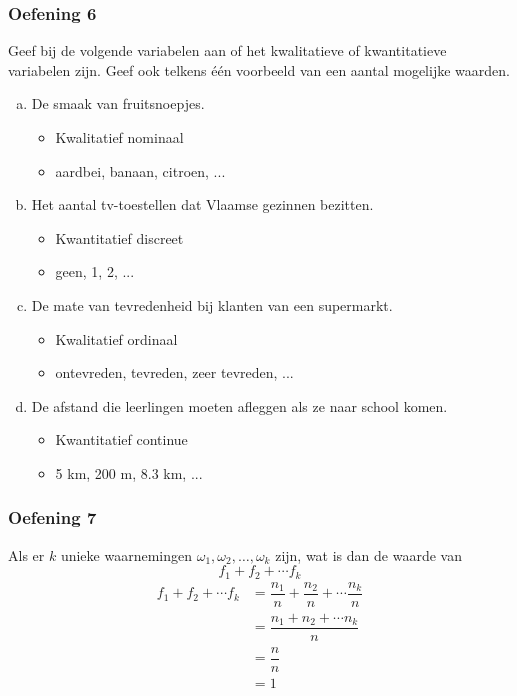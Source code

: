 \documentclass[13pt]{beamer}
\newenvironment{answer}
{\color{blue}}
{\color{black}}
\begin{document}
\begin{frame}
  \frametitle{Oefening 6}
  Geef bij de volgende variabelen aan of het kwalitatieve of kwantitatieve variabelen zijn. Geef ook telkens één voorbeeld van een aantal mogelijke waarden.
  \begin{enumerate}[(a)]
  \item De smaak van fruitsnoepjes.
    \begin{itemize}
      \begin{answer}
      \item Kwalitatief nominaal
      \item aardbei, banaan, citroen, ...
      \end{answer}
    \end{itemize}
  \item Het aantal tv-toestellen dat Vlaamse gezinnen bezitten.
    \begin{itemize}
      \begin{answer}
      \item Kwantitatief discreet
      \item geen, 1, 2, ...
      \end{answer}
    \end{itemize}
  \item De mate van tevredenheid bij klanten van een supermarkt.
    \begin{itemize}
      \begin{answer}
      \item Kwalitatief ordinaal
      \item ontevreden, tevreden, zeer tevreden, ...
      \end{answer}
    \end{itemize}
  \item De afstand die leerlingen moeten afleggen als ze naar school komen.
    \begin{itemize}
      \begin{answer}
      \item Kwantitatief continue
      \item 5 km, 200 m, 8.3 km, ...
      \end{answer}
    \end{itemize}
  \end{enumerate}
\end{frame}

\begin{frame}
  \frametitle{Oefening 7}
  Als er $k$ unieke waarnemingen $\omega_1, \omega_2, \ldots, \omega_k$ zijn, wat is dan de waarde van
  $$f_1 + f_2 + \cdots f_k$$
  \begin{answer}
    \begin{align*}
      f_1 + f_2 + \cdots f_k &= \dfrac{n_1}{n} + \dfrac{n_2}{n} + \cdots \dfrac{n_k}{n}\\
                             &= \dfrac{n_1 + n_2 + \cdots n_k}{n}\\
                             &= \dfrac{n}{n}\\
                             &= 1
    \end{align*}
  \end{answer}
\end{frame}
\end{document}
